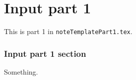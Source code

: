 \documentclass[english, nochinese]{note}
\begin{document}
\part{Input part 1}

This is part 1 in \verb"noteTemplatePart1.tex".

\section{Input part 1 section}

Something.
\end{document}
